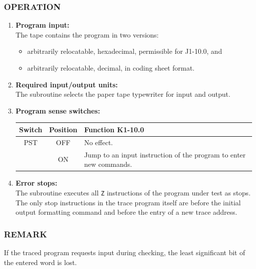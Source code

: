 \subsubsection*{OPERATION}
\begin{enumerate}
    \item \textbf{Program input:} \\
    The tape contains the program in two versions:
    \begin{itemize}
        \item[a)] arbitrarily relocatable, hexadecimal, permissible for J1-10.0, and
        \item[b)] arbitrarily relocatable, decimal, in coding sheet format.
    \end{itemize}
    \item \textbf{Required input/output units:} \\
    The subroutine selects the paper tape typewriter for input and output.
    \item \textbf{Program sense switches:}
    \begin{table}[h!]
    \centering
    \begin{tabularx}{\textwidth}{ccX}
    \toprule
    \textbf{Switch} & \textbf{Position} & \textbf{Function K1-10.0} \\
    \midrule
    PST             & OFF               & No effect. \\
                    & ON                & Jump to an input instruction of the program to enter new commands. \\
    \bottomrule
    \end{tabularx}
    \end{table}
    \item \textbf{Error stops:} \\
    The subroutine executes all \texttt{Z} instructions of the program under test as stops. The only stop instructions in the trace program itself are before the initial output formatting command and before the entry of a new trace address.
\end{enumerate}

\subsubsection*{REMARK}
If the traced program requests input during checking, the least significant bit of the entered word is lost.
\newpage